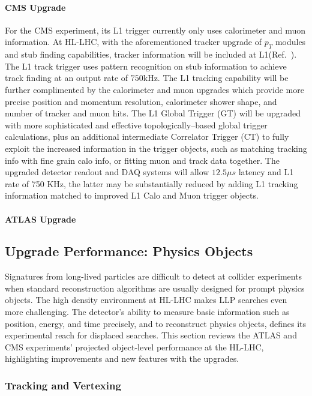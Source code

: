 \paragraph{CMS Upgrade} 
For the CMS experiment, its L1 trigger currently only uses calorimeter and muon information. At HL-LHC, with the aforementioned tracker upgrade of $p_T$ modules and stub finding capabilities, tracker information will be included at L1(Ref.~\cite{Lourenco:2283192}). 
The L1 track trigger uses pattern recognition on stub information to achieve track finding at an output rate of $750$kHz. 
The L1 tracking capability will be further complimented by the calorimeter and muon upgrades which provide more precise position and momentum resolution, calorimeter shower shape, and number of tracker and muon hits.
The L1 Global Trigger (GT) will be upgraded with more sophisticated and effective topologically--based global trigger calculations, 
plus an additional intermediate Correlator Trigger (CT) to fully exploit the increased information in the trigger objects, such as matching tracking info with fine grain calo info, or fitting muon and track data together.
The upgraded detector readout and DAQ systems will allow $12.5 \mu s$ latency and L1 rate of 750 KHz, the latter may be substantially reduced by adding L1 tracking information matched to improved L1 Calo and Muon trigger objects. 

\paragraph{ATLAS Upgrade}

\subsection{Upgrade Performance: Physics Objects} \label{sec:upgradeobject}

Signatures from long-lived particles are difficult to detect at collider experiments when standard reconstruction algorithms are usually designed for prompt physics objects. The high density environment at HL-LHC makes LLP searches even more challenging. 
The detector's ability to measure basic information such as position, energy, and time precisely, and to reconstruct physics objects, defines its experimental reach for displaced searches.
This section reviews the ATLAS and CMS experiments' projected object-level performance at the HL-LHC, highlighting improvements and new features with the upgrades.

\subsubsection{Tracking and Vertexing} 


